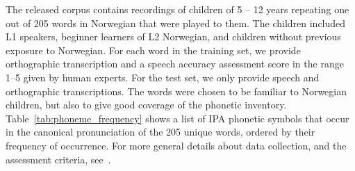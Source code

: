 \documentclass{article}
\begin{document}
\begin{table}[]
    \centering
    \caption{Phonetic inventory with number of occurrences over pronunciations.}
    \label{tab:phoneme_frequency}
\end{table}

The released corpus contains recordings of children of 5 – 12 years repeating one out of 205 words in Norwegian that were played to them.
The children included L1 speakers, beginner learners of L2 Norwegian, and children without previous exposure to Norwegian.
For each word in the training set, we provide orthographic transcription and a speech accuracy assessment score in the range 1--5 given by human experts.
For the test set, we only provide speech and orthographic transcriptions.
The words were chosen to be familiar to Norwegian children, but also to give good coverage of the phonetic inventory.
Table~\ref{tab:phoneme_frequency} shows a list of IPA phonetic symbols that occur in the canonical pronunciation of the 205 unique words, ordered by their frequency of occurrence.
For more general details about data collection, and the assessment criteria, see~\cite{TeflonDataLREC2024}.
\end{document}
